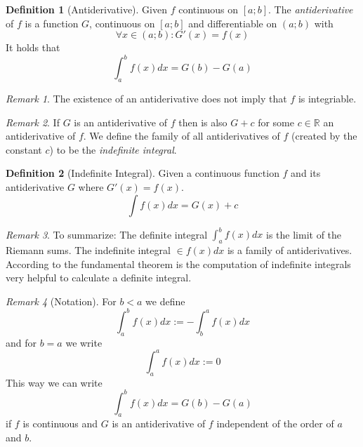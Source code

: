 \documentclass[english,titlepage]{uzhpub}
\theoremstyle{definition}
\newtheorem{definition}{Definition}[section]
\theoremstyle{plain}
\theoremstyle{remark}
\newtheorem*{remark}{Remark}
\theoremstyle{example}
\begin{document}
   \begin{definition}[Antiderivative]
      Given \(f\) continuous on \([a;b]\).
      The \textit{antiderivative} of \(f\) is a function \(G\), continuous on \([a;b]\) and differentiable on \((a;b)\) with
      \[\forall x \in (a;b): G'(x) = f(x)\]
      It holds that
      \[\int_a^b f(x) dx = G(b) - G(a)\]
   \end{definition}
   \begin{remark}
      The existence of an antiderivative does not imply that \(f\) is integriable.
   \end{remark}
   \begin{remark}
      If \(G\) is an antiderivative of \(f\) then is also \(G + c\) for some \(c \in \mathbb{R}\) an antiderivative of \(f\).
      We define the family of all antiderivatives of \(f\) (created by the constant \(c\)) to be the \textit{indefinite integral}.
   \end{remark}

   \begin{definition}[Indefinite Integral]
      Given a continuous function \(f\) and its antiderivative \(G\) where \(G'(x) = f(x)\).
      \[\int f(x) dx = G(x) + c\]
   \end{definition}
   \begin{remark}
      To summarize:
      The definite integral \(\int_a^b f(x) dx\) is the limit of the Riemann sums.
      The indefinite integral \(\in f(x) dx\) is a family of antiderivatives.
      According to the fundamental theorem is the computation of indefinite integrals very helpful to calculate a definite integral.
   \end{remark}

   \begin{remark}[Notation]
      For \(b < a\) we define
      \[\int_a^b f(x) dx := -\int_b^a f(x)dx\]
      and for \(b = a\) we write
      \[\int_a^a f(x) dx := 0\]
      This way we can write
      \[\int_a^b f(x) dx = G(b) - G(a)\]
      if \(f\) is continuous and \(G\) is an antiderivative of \(f\) independent of the order of \(a\) and \(b\).
   \end{remark}
\end{document}

